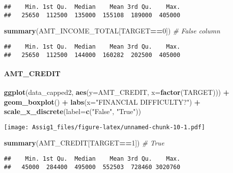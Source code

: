 \documentclass[
]{article}
\newenvironment{Shaded}{\begin{snugshade}}{\end{snugshade}}
\newcommand{\AttributeTok}[1]{\textcolor[rgb]{0.13,0.29,0.53}{#1}}
\newcommand{\CommentTok}[1]{\textcolor[rgb]{0.56,0.35,0.01}{\textit{#1}}}
\newcommand{\DecValTok}[1]{\textcolor[rgb]{0.00,0.00,0.81}{#1}}
\newcommand{\FunctionTok}[1]{\textcolor[rgb]{0.13,0.29,0.53}{\textbf{#1}}}
\newcommand{\NormalTok}[1]{#1}
\newcommand{\SpecialCharTok}[1]{\textcolor[rgb]{0.81,0.36,0.00}{\textbf{#1}}}
\newcommand{\StringTok}[1]{\textcolor[rgb]{0.31,0.60,0.02}{#1}}
\begin{document}
\begin{verbatim}
##    Min. 1st Qu.  Median    Mean 3rd Qu.    Max. 
##   25650  112500  135000  155108  189000  405000
\end{verbatim}

\begin{Shaded}
\begin{Highlighting}[]
\FunctionTok{summary}\NormalTok{(AMT\_INCOME\_TOTAL[TARGET}\SpecialCharTok{==}\DecValTok{0}\NormalTok{]) }\CommentTok{\# False column}
\end{Highlighting}
\end{Shaded}

\begin{verbatim}
##    Min. 1st Qu.  Median    Mean 3rd Qu.    Max. 
##   25650  112500  144000  160282  202500  405000
\end{verbatim}

\hypertarget{amt_credit-1}{%
\paragraph{AMT\_CREDIT}\label{amt_credit-1}}

\begin{Shaded}
\begin{Highlighting}[]
\FunctionTok{ggplot}\NormalTok{(data\_capped2, }\FunctionTok{aes}\NormalTok{(}\AttributeTok{y=}\NormalTok{AMT\_CREDIT, }\AttributeTok{x=}\FunctionTok{factor}\NormalTok{(TARGET))) }\SpecialCharTok{+}
  \FunctionTok{geom\_boxplot}\NormalTok{() }\SpecialCharTok{+}
  \FunctionTok{labs}\NormalTok{(}\AttributeTok{x=}\StringTok{"FINANCIAL DIFFICULTY?"}\NormalTok{) }\SpecialCharTok{+}
  \FunctionTok{scale\_x\_discrete}\NormalTok{(}\AttributeTok{label=}\FunctionTok{c}\NormalTok{(}\StringTok{"False"}\NormalTok{, }\StringTok{"True"}\NormalTok{))}
\end{Highlighting}
\end{Shaded}

\texttt{[image: Assig1\_files/figure-latex/unnamed-chunk-10-1.pdf]}

\begin{Shaded}
\begin{Highlighting}[]
\FunctionTok{summary}\NormalTok{(AMT\_CREDIT[TARGET}\SpecialCharTok{==}\DecValTok{1}\NormalTok{]) }\CommentTok{\# True}
\end{Highlighting}
\end{Shaded}

\begin{verbatim}
##    Min. 1st Qu.  Median    Mean 3rd Qu.    Max. 
##   45000  284400  495000  552503  728460 3020760
\end{verbatim}
\end{document}
